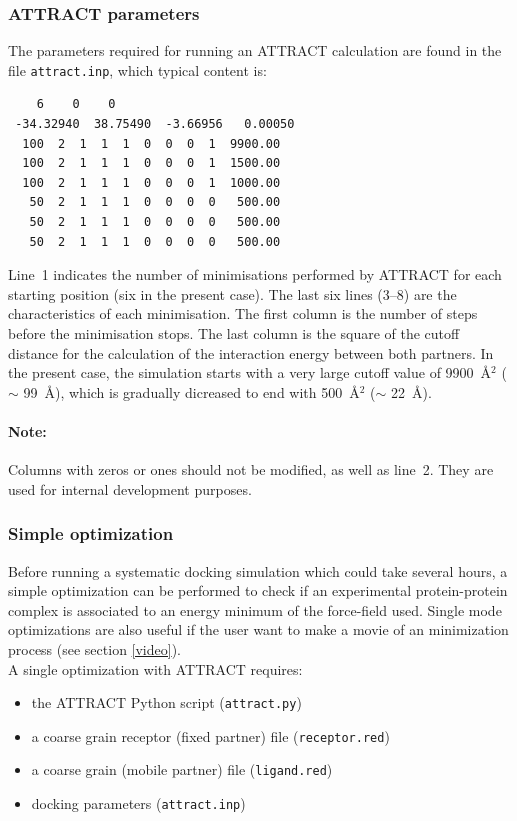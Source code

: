 \documentclass[12pt,a4paper]{article}
\begin{document}
\subsubsection{ATTRACT parameters}
The parameters required for running an ATTRACT calculation are found in the file {\tt attract.inp}, which typical content is:

\linenumbers*
\begin{verbatim}
    6    0    0
 -34.32940  38.75490  -3.66956   0.00050
  100  2  1  1  1  0  0  0  1  9900.00
  100  2  1  1  1  0  0  0  1  1500.00
  100  2  1  1  1  0  0  0  1  1000.00
   50  2  1  1  1  0  0  0  0   500.00
   50  2  1  1  1  0  0  0  0   500.00
   50  2  1  1  1  0  0  0  0   500.00
\end{verbatim}
\nolinenumbers

Line~1 indicates the number of minimisations performed by ATTRACT
for each starting position (six in the present case). The last six lines (3--8) 
are the characteristics of
each minimisation. The first column is the number of steps before the
minimisation stops.  The last column is the square of the cutoff distance
for the calculation of the interaction energy between both partners. 
In the present case, the simulation starts with a very large cutoff value of 9900~\AA$^2$ 
($\sim$ 99~\AA), which is gradually dicreased
to end with 500~\AA$^2$ ($\sim$ 22~\AA).

\paragraph{Note:} Columns with zeros or ones should not be modified, as
well as line~2. They are used for internal development purposes.

\subsubsection{Simple optimization}
Before running a systematic docking simulation which could take several hours, a simple optimization can be performed to check if an experimental protein-protein complex is associated to an energy minimum of the force-field used. Single mode optimizations are also useful if the user want to make a movie of an minimization process (see section \ref{video}).\\

A single optimization with ATTRACT requires:
\begin{itemize}
\item the ATTRACT Python script ({\tt  attract.py})
\item a coarse grain receptor (fixed partner) file ({\tt receptor.red})
\item a coarse grain (mobile partner) file ({\tt ligand.red})
\item docking parameters ({\tt attract.inp})\\
\end{itemize}
\end{document}
